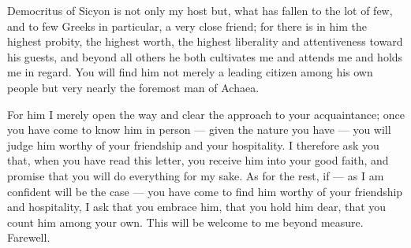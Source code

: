

 Democritus of Sicyon is not only my host but, what has fallen to the lot of few, and to few Greeks in particular, a very close friend; for there is in him the highest probity, the highest worth, the highest liberality and attentiveness toward his guests, and beyond all others he both cultivates me and attends me and holds me in regard. You will find him not merely a leading citizen among his own people but very nearly the foremost man of Achaea.

 For him I merely open the way and clear the approach to your acquaintance; once you have come to know him in person --- given the nature you have --- you will judge him worthy of your friendship and your hospitality. I therefore ask you that, when you have read this letter, you receive him into your good faith, and promise that you will do everything for my sake. As for the rest, if --- as I am confident will be the case --- you have come to find him worthy of your friendship and hospitality, I ask that you embrace him, that you hold him dear, that you count him among your own. This will be welcome to me beyond measure. Farewell.
